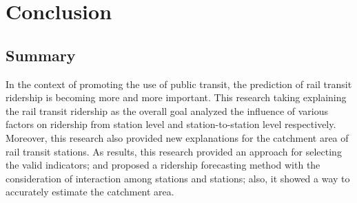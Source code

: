 \chapter{Conclusion}
%
\section{Summary}
In the context of promoting the use of public transit, the prediction of rail transit ridership is becoming more and more important. This research taking explaining the rail transit ridership as the overall goal analyzed the influence of various factors on ridership from station level and station-to-station level respectively. Moreover, this research also provided new explanations for the catchment area of rail transit stations. As results, this research provided an approach for selecting the valid indicators; and proposed a ridership forecasting method with the consideration of interaction among stations and stations; also, it showed a way to accurately estimate the catchment area.

